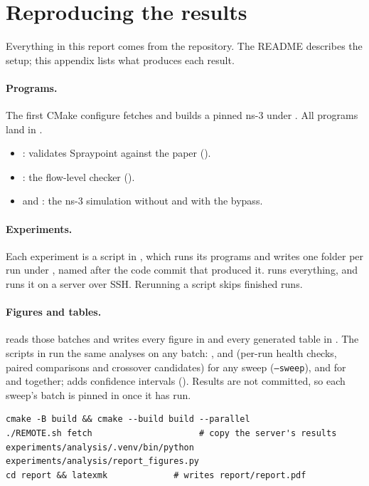 \section{Reproducing the results}
\label{app:reproducing}

Everything in this report comes from the repository. The README describes the setup; this appendix lists what produces each result.

\paragraph{Programs.} The first CMake configure fetches and builds a pinned ns-3 under . All programs land in .
\begin{itemize}
  \item {}: validates Spraypoint against the paper ().
  \item {}: the flow-level checker ().
  \item {} and : the ns-3 simulation without and with the bypass.
\end{itemize}

\paragraph{Experiments.} Each experiment is a script in , which runs its programs and writes one folder per run under , named after the code commit that produced it.  runs everything, and  runs it on a server over SSH. Rerunning a script skips finished runs.

\paragraph{Figures and tables.}  reads those batches and writes every figure in  and every generated table in . The scripts in  run the same analyses on any batch: ,  and  (per-run health checks, paired comparisons and crossover candidates) for any sweep (\texttt{--sweep}), and  for  and  together;  adds confidence intervals (). Results are not committed, so each sweep's batch is pinned in  once it has run.

\begin{verbatim}
cmake -B build && cmake --build build --parallel
./REMOTE.sh fetch                     # copy the server's results
experiments/analysis/.venv/bin/python experiments/analysis/report_figures.py
cd report && latexmk             # writes report/report.pdf
\end{verbatim}
